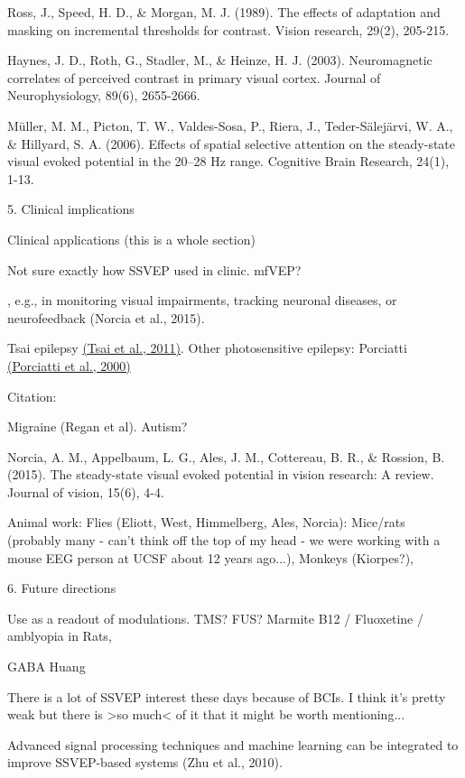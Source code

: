 \documentclass[
  letterpaper,
  DIV=11,
  numbers=noendperiod]{scrartcl}
\begin{document}
Ross, J., Speed, H. D., \& Morgan, M. J. (1989). The effects of
adaptation and masking on incremental thresholds for contrast. Vision
research, 29(2), 205-215.

Haynes, J. D., Roth, G., Stadler, M., \& Heinze, H. J. (2003).
Neuromagnetic correlates of perceived contrast in primary visual cortex.
Journal of Neurophysiology, 89(6), 2655-2666.

Müller, M. M., Picton, T. W., Valdes-Sosa, P., Riera, J.,
Teder-Sälejärvi, W. A., \& Hillyard, S. A. (2006). Effects of spatial
selective attention on the steady-state visual evoked potential in the
20--28 Hz range. Cognitive Brain Research, 24(1), 1-13.

5. Clinical implications

\label{anchor-9}{}Clinical applications (this is a whole
section)

Not sure exactly how SSVEP used in clinic. mfVEP?

, e.g., in monitoring visual impairments, tracking neuronal diseases, or
neurofeedback (Norcia et al., 2015).

Tsai epilepsy \href{https://www.zotero.org/google-docs/?AdhH3f}{(Tsai et
al., 2011)}. Other photosensitive epilepsy: Porciatti
\href{https://www.zotero.org/google-docs/?UTBQbV}{(Porciatti et al.,
2000)}

Citation:

Migraine (Regan et al). Autism?

Norcia, A. M., Appelbaum, L. G., Ales, J. M., Cottereau, B. R., \&
Rossion, B. (2015). The steady-state visual evoked potential in vision
research: A review. Journal of vision, 15(6), 4-4.

Animal work: Flies (Eliott, West, Himmelberg, Ales, Norcia): Mice/rats
(probably many - can't think off the top of my head - we were working
with a mouse EEG person at UCSF about 12 years ago...), Monkeys
(Kiorpes?),

\label{anchor-10}{}6. Future directions

Use as a readout of modulations. TMS? FUS? Marmite B12 / Fluoxetine /
amblyopia in Rats,

GABA Huang

There is a lot of SSVEP interest these days because of BCIs. I think
it's pretty weak but there is \textgreater so much\textless{} of it that
it might be worth mentioning...

Advanced signal processing techniques and machine learning can be
integrated to improve SSVEP-based systems (Zhu et al., 2010).
\end{document}
